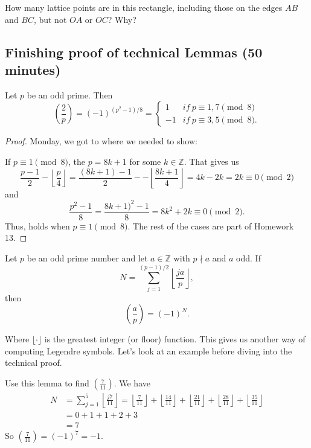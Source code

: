 \documentclass[letterpaper, 11 pt]{article}
\begin{document}
How many lattice points are in this rectangle, including those on the edges $AB$ and $BC$, but not $OA$ or $OC$? Why?
\subsection{Finishing proof of technical Lemmas (50 minutes)}
\begin{thm}[Corollary 7.10]
 Let $p$ be an odd prime. Then 
\begin{equation*}
 \left(\frac{2}{p}\right)=(-1)^{(p^2-1)/8}=
\begin{cases}
 1& if\ p\equiv 1,7 \pmod 8\\
 -1 & if\ p\equiv 3,5 \pmod 8.
\end{cases}
\end{equation*}
\end{thm}
\begin{proof}
Monday, we got to where we needed to show: 

 If $p\equiv 1 \pmod 8$, the $p=8k+1$ for some $k\in\mathbb{Z}$. That gives us
 \[\frac{p-1}{2}-\left\lfloor\frac{p}{4}\right\rfloor=\frac{(8k+1)-1}{2}--\left\lfloor\frac{8k+1}{4}\right\rfloor=4k-2k=2k\equiv 0 \pmod 2\] and
 \[\frac{p^2-1}{8}=\frac{8k+1)^2-1}{8}=8k^2+2k\equiv 0\pmod 2.\]
 Thus,  holds when $p\equiv 1 \pmod 8$. The rest of the cases are part of Homework 13.
\end{proof}

\begin{lem}
 Let $p$ be an odd prime number and let $a\in\mathbb{Z}$ with $p\nmid a$ and $a$ odd. If \[N=\sum_{j=1}^{(p-1)/2}\left\lfloor\frac{ja}{p}\right\rfloor,\] then \[\left(\frac{a}{p}\right)=(-1)^N.\]
\end{lem}
Where $\lfloor\cdot\rfloor$ is the greatest integer (or floor) function. This gives us another way of computing Legendre symbols. Let's look at an example before diving into the technical proof.

\begin{br}[5 minutes]
 Use this lemma to find $\left(\frac{7}{11}\right)$. We have
 \begin{align*}
 N&=\sum_{j=1}^{ {5}
 }
 \left\lfloor\frac{j7}{11}\right\rfloor= \left\lfloor\frac{7}{11}\right\rfloor+ \left\lfloor\frac{14}{11}\right\rfloor+\left\lfloor\frac{21}{11}\right\rfloor+ \left\lfloor\frac{28}{11}\right\rfloor+\left\lfloor\frac{35}{11}\right\rfloor\\
 &= {0}
 + {1}
 + {1}
 + {2}
 + {3}
 \\&=
  {7}
 \end{align*}
 So $\left(\frac{7}{11}\right)=(-1)^{ {7}
 }= {-1}
 .$
\end{br}
\end{document}
